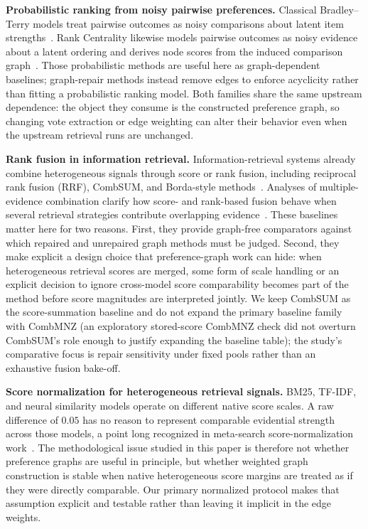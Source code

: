 \documentclass[manuscript,anonymous,review]{acmart}
\begin{document}
\textbf{Probabilistic ranking from noisy pairwise preferences.} Classical
Bradley--Terry models treat pairwise outcomes as noisy comparisons about latent
item strengths~\cite{bradley1952rank}. Rank Centrality likewise models pairwise
outcomes as noisy evidence about a latent ordering and derives node scores from
the induced comparison
graph~\cite{negahban2017rankcentrality}. Those probabilistic methods are useful
here as graph-dependent baselines; graph-repair methods instead remove edges to
enforce acyclicity rather than fitting a probabilistic ranking model. Both
families share the same upstream dependence: the object they consume is the
constructed preference graph, so changing vote extraction or edge weighting can
alter their behavior even when the upstream retrieval runs are unchanged.

\textbf{Rank fusion in information retrieval.} Information-retrieval systems
already combine heterogeneous signals through score or rank fusion, including
reciprocal rank fusion (RRF), CombSUM, and Borda-style methods~\cite{cormack2009rrf,fox1994combination,lee1997analyses}.
Analyses of multiple-evidence combination clarify how score- and
rank-based fusion behave when several retrieval strategies contribute overlapping
evidence~\cite{lee1997analyses}. These baselines matter here for two reasons.
First, they provide graph-free comparators against which repaired and unrepaired
graph methods must be judged. Second, they make explicit a design choice that
preference-graph work can hide: when heterogeneous retrieval scores are merged,
some form of scale handling or an explicit decision to ignore cross-model score
comparability becomes part of the method before score magnitudes are interpreted
jointly. We keep CombSUM as the score-summation baseline and do not expand the
primary baseline family with CombMNZ (an exploratory stored-score CombMNZ check did not overturn CombSUM's role enough to justify expanding the baseline table); the study's comparative focus is
repair sensitivity under fixed pools rather than an exhaustive fusion bake-off.

\textbf{Score normalization for heterogeneous retrieval signals.} BM25, TF-IDF,
and neural similarity models operate on different native score scales. A raw
difference of $0.05$ has no reason to represent comparable evidential strength
across those models, a point long recognized in meta-search score-normalization
work~\cite{manmatha2002formal}. The methodological issue studied in this paper
is therefore not whether preference graphs are useful in principle, but whether
weighted graph construction is stable when native heterogeneous score margins
are treated as if they were directly comparable. Our primary normalized protocol
makes that assumption explicit and testable rather than leaving it implicit in
the edge weights.
\end{document}
